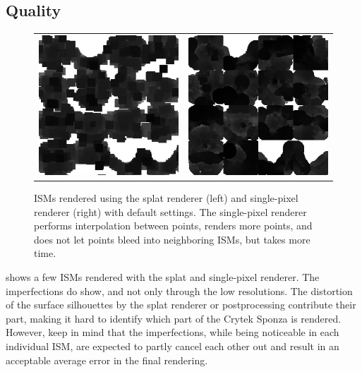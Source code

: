 \subsection{Quality}
\label{sec:results:ism:quality}

\begin{figure}[htb]
\centering
  \begin{tabular}{@{}cc@{}}
    \includegraphics[width=.48\textwidth]{screenshots/ism_splat_cropped} &
    \includegraphics[width=.48\textwidth]{screenshots/ism_single_pixel_cropped}
  \end{tabular}
  \caption{ISMs rendered using the splat renderer (left) and single-pixel renderer (right) with default settings. The single-pixel renderer performs interpolation between points, renders more points, and does not let points bleed into neighboring ISMs, but takes more time.}
  \label{fig:results:isms}
\end{figure}

 shows a few ISMs rendered with the splat and single-pixel renderer. The imperfections do show, and not only through the low resolutions. The distortion of the surface silhouettes by the splat renderer or postprocessing contribute their part, making it hard to identify which part of the Crytek Sponza is rendered. However, keep in mind that the imperfections, while being noticeable in each individual ISM, are expected to partly cancel each other out and result in an acceptable average error in the final rendering.

